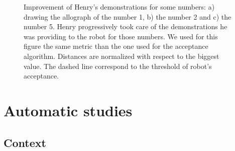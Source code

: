 \documentclass{sig-alternate}
\begin{document}
\begin{figure}
    \centering
    \caption{\small Improvement of Henry's demonstrations for some numbers: a) drawing the allograph of the number 1, b) the number 2 and c) the number 5. Henry progressively took care of the demonstrations he was providing to the robot for those numbers. We used for this figure the same metric than the one used for the acceptance algorithm. Distances are normalized with respect to the biggest value. The dashed line correspond to the threshold of robot's acceptance.}

    \label{henry_progress}
\end{figure}

\section{Automatic studies}\label{auto}

\subsection{Context}
\end{document}
